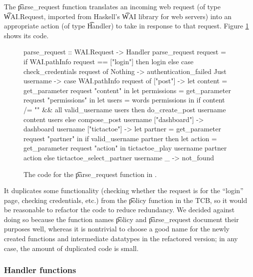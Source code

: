 \begin{refsection}
The \t{parse\_request} function translates an incoming web request
(of type \t{WAI.Request}, imported from Haskell's \t{WAI} library for web servers)
into an appropriate action (of type \t{Handler}) to take in response to that request.
%
Figure \ref{code_parse_request} shows its code.
\begin{figure}
\begin{fb}
parse_request :: WAI.Request -> Handler
parse_request request =
  if WAI.pathInfo request == ["login"] then
    login
  else case check_credentials request of
    Nothing ->
      authentication_failed
    Just username -> case WAI.pathInfo request of
      ["post"] ->
        let content = get_parameter request "content"  in
        let permissions = get_parameter request "permissions"  in
        let users = words permissions  in
        if content /= "" && all valid_username users then
          do_create_post username content users
        else
          compose_post username
      ["dashboard"] ->
        dashboard username
      ["tictactoe"] ->
        let partner = get_parameter request "partner"  in
        if valid_username partner then
          let action = get_parameter request "action"  in
          tictactoe_play username partner action
        else
          tictactoe_select_partner username
      _ ->
        not_found
\end{fb}
\caption{The code for the \t{parse\_request} function in \viF{}.}
\label{code_parse_request}
\end{figure}
It duplicates some functionality
(checking whether the request is for the ``login'' page, checking credentials, etc.)
from the \t{policy} function in the TCB,
so it would be reasonable to refactor the code to reduce redundancy.
%
We decided against doing so because the function names \t{policy} and \t{parse\_request} document their purposes well,
whereas it is nontrivial to choose a good name for the newly created functions and intermediate datatypes in the refactored version;
in any case, the amount of duplicated code is small.

\subsubsection{Handler functions}


\end{refsection}
